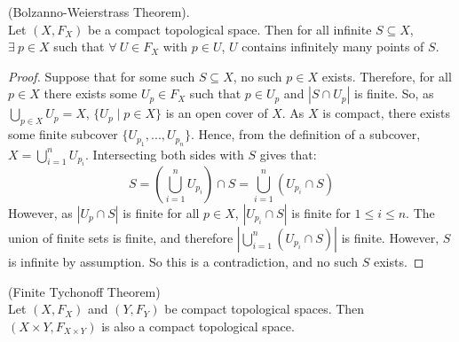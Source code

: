 \begin{theorem}
	(Bolzanno-Weierstrass Theorem).\\
	Let $(X,F_X)$ be a compact topological space. Then for all infinite $S \subseteq X$, $\exists \ p \in X$ such that $\forall \ U \in F_X$ with $p \in U$, $U$ contains infinitely many points of $S$. 
\end{theorem}
\begin{proof}
	Suppose that for some such $S \subseteq X$, no such $p \in X$ exists. Therefore, for all $p \in X$ there exists some $U_p \in F_X$ such that $p \in U_p$ and $|S \cap U_p|$ is finite. So, as $\displaystyle{\bigcup_{p \in X} U_p = X}$, $\{U_p \mid p \in X\}$ is an open cover of $X$. As $X$ is compact, there exists some finite subcover $\{U_{p_1},...,U_{p_n}\}$. Hence, from the definition of a subcover, $\displaystyle{X = \bigcup_{i=1}^n U_{p_i}}$. Intersecting both sides with $S$ gives that:
	\[S = \left(\bigcup_{i=1}^n U_{p_i}\right) \cap S = \bigcup_{i=1}^n (U_{p_i} \cap S)\]
	However, as $|U_p \cap S|$ is finite for all $p \in X$, $|U_{p_i} \cap S|$ is finite for $1 \leq i \leq n$. The union of finite sets is finite, and therefore $\left|\bigcup_{i=1}^n (U_{p_i} \cap S)\right|$ is finite. However, $S$ is infinite by assumption. So this is a contradiction, and no such $S$ exists. 
\end{proof}
\newpage
\begin{theorem}
	(Finite Tychonoff Theorem) \\
	Let $(X,F_X)$ and $(Y,F_Y)$ be compact topological spaces. Then $(X \times Y, F_{X \times Y})$ is also a compact topological space. 
\end{theorem}

